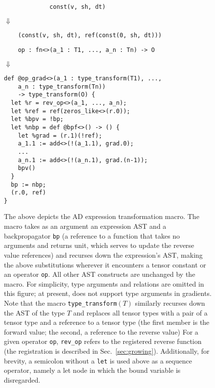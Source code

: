 \begin{figure}
  \begin{verbatim}
             const(v, sh, dt)
  \end{verbatim}
  $\Downarrow$
  \begin{verbatim}
    (const(v, sh, dt), ref(const(0, sh, dt)))
  \end{verbatim}
  \vspace{0.25cm}
  \begin{verbatim}
    op : fn<>(a_1 : T1, ..., a_n : Tn) -> O
  \end{verbatim}
  $\Downarrow$
  \begin{verbatim}
def @op_grad<>(a_1 : type_transform(T1), ...,
    a_n : type_transform(Tn))
    -> type_transform(O) {
  let %r = rev_op<>(a_1, ..., a_n);
  let %ref = ref(zeros_like<>(r.0));
  let %bpv = !bp;
  let %nbp = def @bpf<>() -> () {
    let %grad = (r.1)(!ref);
    a_1.1 := add<>(!(a_1.1), grad.0);
    ...
    a_n.1 := add<>(!(a_n.1), grad.(n-1));
    bpv()
  }
  bp := nbp;
  (r.0, ref)
}
  \end{verbatim}
  \caption{
    The above depicts the AD expression
      transformation macro.
    The macro takes as an
      argument an expression AST and a backpropagator
      \texttt{bp}
      (a reference to a function that takes no
      arguments and returns unit,
      which serves to update the reverse value references)
      and recurses down the expression's AST,
      making the above substitutions wherever
      it encounters a tensor constant or an operator
      \texttt{op}.
    All other AST constructs are unchanged by the macro.
    For simplicity, type arguments and relations
      are omitted in this figure;
      at present, \relay does not
      support type arguments in gradients.
    Note that the macro \texttt{type\_transform}$(T)$
      similarly recurses down the AST of the type $T$
      and replaces all tensor types with a
      pair of a tensor type
      and a reference to a tensor type
      (the first member is the forward value;
      the second, a reference to the reverse value)
    For a given operator \texttt{op},
      \texttt{rev\_op} refers to the registered reverse function
      (the registration is described in Sec.~\ref{sec:growing}).
    Additionally, for brevity,
      a semicolon without a \texttt{let}
      is used above as a sequence operator,
      namely a let node in which the bound
      variable is disregarded.}
  \label{fig:ad-expr-transform}
\end{figure}

